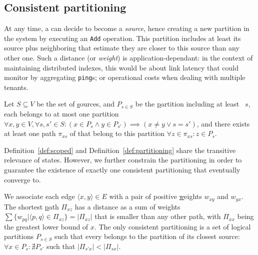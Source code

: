 

\subsection{Consistent partitioning}
\label{subsec:consistent}

At any time, a \process can decide to become a \emph{source}, hence
creating a new partition in the system by executing an \texttt{Add}
operation. This partition includes at least its source plus
neighboring \processes that estimate they are closer to this source
than any other one. Such a distance (or \emph{weight}) is
application-dependant: in the context of maintaining distributed
indexes, this would be about link latency that \nodes could monitor by
aggregating \texttt{ping}s; or operational costs when dealing with
multiple tenants.

\begin{definition}
  Let $S \subseteq V$ be the set of \underline{s}ources, and $P_{s\in
    S}$ be the \underline{p}artition including at least \Process~$s$,
  each \process belongs to at most one partition $\forall x, y \in V,
  \forall s,s' \in S: (x \in P_{s} \wedge y \in P_{s'}) \implies (x \neq
  y \vee s = s')$, and there exists at least one path $\pi_{xs}$ of
  \processes that belong to this partition $\forall z \in \pi_{xs}: z
  \in P_s$.
\end{definition}

Definition~\ref{def:scoped} and Definition~\ref{def:partitioning}
share the transitive relevance of \process states. However, we further
constrain the partitioning in order to guarantee the existence of
exactly one consistent partitioning that \processes eventually converge
to.

\begin{definition}
  We associate each edge $\langle x, y \rangle \in E$ with a pair of
  positive \underline{w}eights $w_{xy}$ and $w_{yx}$. The shortest
  \underline{p}ath $\Pi_{xz}$ has a distance as a sum of weights
  $\sum\{w_{pq} | \langle p, q \rangle \in \Pi_{xz}\} = |\Pi_{xz}|$
  that is smaller than any other path, with $\Pi_{xx}$ being the
  greatest lower bound of $x$. The only consistent partitioning is a
  set of logical partitions $P_{s\in S}$ such that every \process
  belongs to the partition of its closest source:
  $\forall x \in P_{s}: \nexists P_{s'}$ such that
  $|\Pi_{s'x}| < |\Pi_{sx}|$.
\end{definition}

